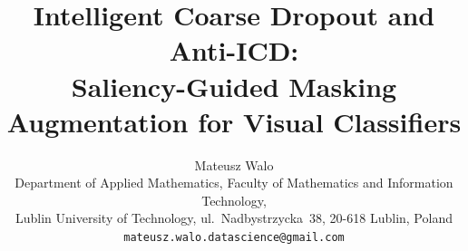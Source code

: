 \documentclass{article}
\title{Intelligent Coarse Dropout and Anti-ICD:\\Saliency-Guided Masking Augmentation for Visual Classifiers}
\author{%
  Mateusz Walo\\[4pt]
  \normalsize Department of Applied Mathematics,
  Faculty of Mathematics and Information Technology,\\
  \normalsize Lublin University of Technology,
  ul.~Nadbystrzycka~38, 20-618 Lublin, Poland\\
  \normalsize \texttt{mateusz.walo.datascience@gmail.com}
}
\date{}
\newcommand{\1}{\mathbf{1}}
\begin{document}
\maketitle

\begin{abstract}

\end{abstract}










\end{document}
